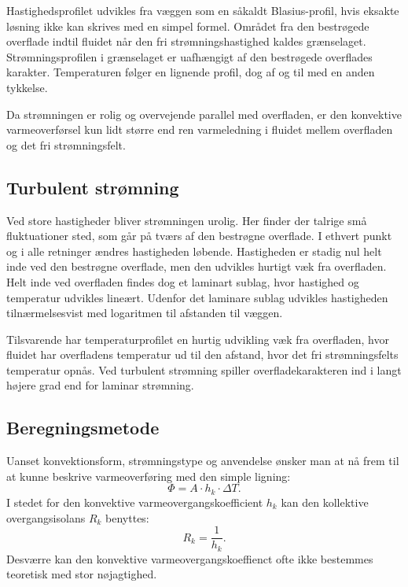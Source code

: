 Hastighedsprofilet udvikles fra væggen som en såkaldt Blasius-profil, hvis eksakte løsning ikke kan skrives med en simpel formel. Området fra den bestrøgede overflade indtil fluidet når den fri strømningshastighed kaldes grænselaget. Strømningsprofilen i grænselaget er uafhængigt af den bestrøgede overflades karakter. Temperaturen følger en lignende profil, dog af og til med en anden tykkelse.

Da strømningen er rolig og overvejende parallel med overfladen, er den konvektive varmeoverførsel kun lidt større end ren varmeledning i fluidet mellem overfladen og det fri strømningsfelt.

\subsection{Turbulent strømning}
Ved store hastigheder bliver strømningen urolig. Her finder der talrige små fluktuationer sted, som går på tværs af den bestrøgne overflade. I ethvert punkt og i alle retninger ændres hastigheden løbende. Hastigheden er stadig nul helt inde ved den bestrøgne overflade, men den udvikles hurtigt væk fra overfladen. Helt inde ved overfladen findes dog et laminart sublag, hvor hastighed og temperatur udvikles lineært. Udenfor det laminare sublag udvikles hastigheden tilnærmelsesvist med logaritmen til afstanden til væggen.

Tilsvarende har temperaturprofilet en hurtig udvikling væk fra overfladen, hvor fluidet har overfladens temperatur ud til den afstand, hvor det fri strømningsfelts temperatur opnås. Ved turbulent strømning spiller overfladekarakteren ind i langt højere grad end for laminar strømning.

\subsection{Beregningsmetode}
Uanset konvektionsform, strømningstype og anvendelse ønsker man at nå frem til at kunne beskrive varmeoverføring med den simple ligning:
\[ 
\Phi = A \cdot h_k \cdot \Delta T
.\]
I stedet for den konvektive varmeovergangskoefficient $h_k$ kan den kollektive overgangsisolans $R_k$ benyttes:
\[ 
R_k = \frac{1}{h_k}
.\]
Desværre kan den konvektive varmeovergangskoeffienct ofte ikke bestemmes teoretisk med stor nøjagtighed. 
